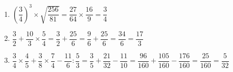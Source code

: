 \documentclass{bis}
\begin{document}
\begin{solution}
  \begin{enumerate}
    \item $\left(\dfrac{3}{4}\right)^3\times\sqrt{\dfrac{256}{81}}=\dfrac{27}{64}\times\dfrac{16}{9}=\dfrac{3}{4}$
    \item $\dfrac{3}{2}+\dfrac{10}{3}\times\dfrac{5}{4}=\dfrac{3}{2}+\dfrac{25}{6}=\dfrac{9}{6}+\dfrac{25}{6}=\dfrac{34}{6}=\dfrac{17}{3}$
    \item $\dfrac{3}{4}\times\dfrac{4}{5}+\dfrac{3}{8}\times\dfrac{7}{4}-\dfrac{11}{6}:\dfrac{5}{3}=\dfrac{3}{5}+\dfrac{21}{32}-\dfrac{11}{10}=\dfrac{96}{160}+\dfrac{105}{160}-\dfrac{176}{160}=\dfrac{25}{160}=\dfrac{5}{32}$
  \end{enumerate}
\end{solution}

\oplossingen
\end{document}
